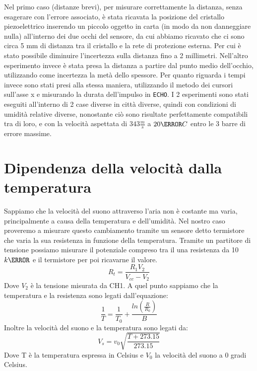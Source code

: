\documentclass[10pt, a4paper, italian]{article}
\begin{document}
Nel primo caso (distanze brevi), per misurare correttamente la distanza, senza esagerare con l'errore associato, è stata ricavata la posizione del cristallo piezoelettrico inserendo un piccolo oggetto in carta (in modo da non danneggiare nulla) all'interno dei due occhi del sensore, da cui abbiamo ricavato che ci sono circa 5 mm di distanza tra il cristallo e la rete di protezione esterna. Per cui è stato possibile diminuire l'incertezza sulla distanza fino a 2 millimetri. Nell'altro esperimento invece è stata presa la distanza a partire dal punto medio dell'occhio, utilizzando come incertezza la metà dello spessore. Per quanto riguarda i tempi invece sono stati presi alla stessa maniera, utilizzando il metodo dei cursori sull'asse x e misurando la durata dell'impulso in \verb+ECHO+. I 2 esperimenti sono stati eseguiti all'interno di 2 case diverse in città diverse, quindi con condizioni di umidità relative diverse, nonostante ciò sono risultate perfettamente compatibili tra di loro, e con la velocità aspettata di $343 \frac{m}{s}$ a $20 \degree C$ entro le 3 barre di errore massime.
\section{Dipendenza della velocità dalla temperatura}
Sappiamo che la velocità del suono attraverso l'aria non è costante ma varia, principalmente a causa della temperatura e dell'umidità.
Nel nostro caso proveremo a misurare questo cambiamento tramite un sensore detto termistore che varia la sua resistenza in funzione della temperatura.
Tramite un partitore di tensione possiamo misurare il potenziale compreso tra il una resistenza da 10 $k\ohm$ e il termistore per poi ricavarne il valore.
\begin{equation}
R_t=\frac{R_1V_2}{V_{cc}-V_2}
\end{equation}
Dove $V_2$ è la tensione misurata da CH1.
A quel punto sappiamo che la temperatura e la resistenza sono legati dall'equazione:
\begin{equation}
\frac{1}{T}= \frac{1}{T_0} + \frac{ln(\frac{R}{R_0})}{B}
\end{equation}
Inoltre la velocità del suono e la temperatura sono legati da:
\begin{equation}
V_s=v_0\sqrt{\frac{T+273.15}{273.15}}
\end{equation}
Dove T è la temperatura espressa in Celsius e $V_0$ la velocità del suono a 0 gradi Celsius.
\end{document}
